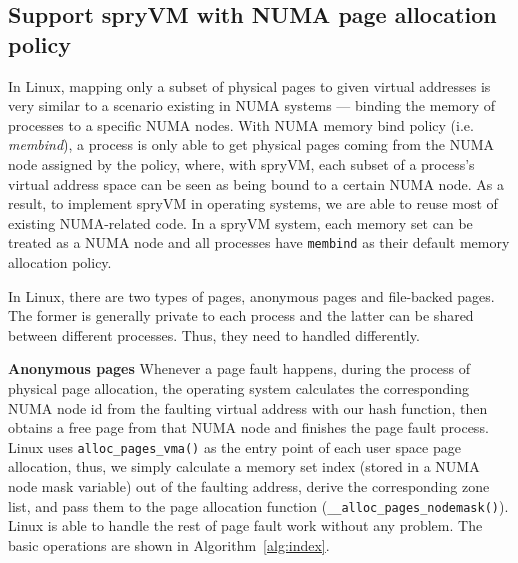 \begin{comment}

\end{comment}

\subsection{Support spryVM with NUMA page allocation policy}
In Linux,  mapping only a subset of physical pages to given virtual addresses is very similar to a scenario existing in NUMA systems — binding the memory of processes to a specific NUMA nodes. With NUMA memory bind policy (i.e. \textit{membind}), a process is only able to get physical pages coming from the NUMA node assigned by the policy, where, with spryVM, each subset of a process’s virtual address space can be seen as being bound to a certain NUMA node. As a result, to implement spryVM in operating systems, we are able to reuse most of existing NUMA-related code. In a spryVM system, each memory set can be treated as a NUMA node and all processes have \verb|membind| as their default memory allocation policy.

In Linux, there are two types of pages, anonymous pages and file-backed pages. The former
is generally private to each process and the latter can be shared between different processes.
Thus, they need to handled differently.

\textbf{Anonymous pages} Whenever a page fault happens, during the process of physical page allocation, the operating system calculates the corresponding NUMA node id from the faulting virtual address with our hash function, then obtains a free page from that NUMA node and finishes the page fault process. Linux uses \verb|alloc_pages_vma()| as the entry point of each user space  page allocation, thus, we simply calculate a memory set index (stored in a NUMA node mask variable) out of the faulting address, derive the corresponding zone list, and pass them to the page allocation function (\verb|__alloc_pages_nodemask()|). Linux is able to handle the rest of page fault work without any problem. The basic operations are shown in Algorithm~\ref{alg:index}.

